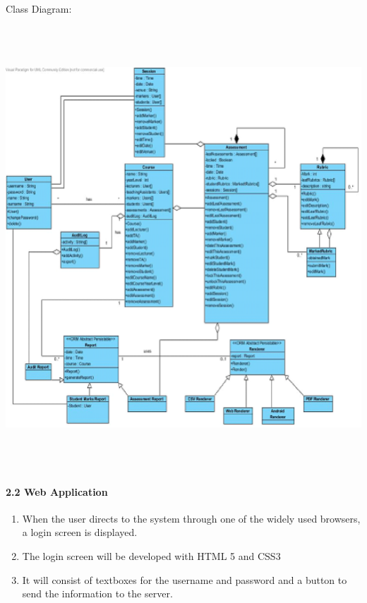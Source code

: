 \documentclass{article}
\begin{document}
 

\noindent Class Diagram:

\includegraphics*[width=6.45in, height=6.53in, keepaspectratio=false]{image2}























\noindent 
\paragraph{2.2  Web Application  }

\begin{enumerate}
\item \textbf{ }When the user directs to the system through one of the widely used browsers, a login screen is displayed. 

\item  The login screen will be developed with HTML 5 and CSS3 

\item  It will consist of textboxes for the username and password and a button to send the information to the server. 
\end{enumerate}
\end{document}
